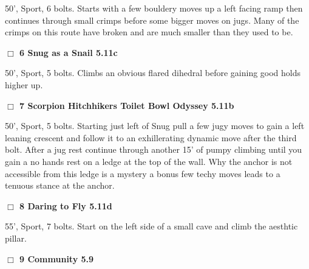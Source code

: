 \begin{multicols}{2}
\begin{adjustwidth}{1.3em}{}
50', Sport, 6 bolts. Starts with a few bouldery moves up a left facing ramp then continues through small crimps before some bigger moves on jugs. Many of the crimps on this route have broken and are much smaller than they used to be.
\end{adjustwidth}




\needspace{2em}
\label{rt:Snug as a Snail}
\colorbox{RoyalBlue!20}{
\parbox{0.95\linewidth}{
\hspace{-1ex}\textbf{$\Box$
6 Snug as a Snail 5.11c  
}}}
\begin{adjustwidth}{1.3em}{}			

50', Sport, 5 bolts. Climbs an obvious flared dihedral before gaining good holds higher up.
\end{adjustwidth}




\needspace{2em}
\label{rt:Scorpion Hitchhikers Toilet Bowl Odyssey}
\colorbox{RoyalBlue!20}{
\parbox{0.95\linewidth}{
\hspace{-1ex}\textbf{$\Box$
7 Scorpion Hitchhikers Toilet Bowl Odyssey 5.11b  
}}}
\begin{adjustwidth}{1.3em}{}			

50', Sport, 5 bolts. Starting just left of Snug pull a few jugy moves to gain a left leaning crescent and follow it to an exhillerating dynamic move after the third bolt. After a jug rest continue through another 15' of pumpy climbing until you gain a no hands rest on a ledge at the top of the wall. Why the anchor is not accessible from this ledge is a mystery a bonus few techy moves leads to a tenuous stance at the anchor.
\end{adjustwidth}




\needspace{2em}
\label{rt:Daring to Fly}
\colorbox{RoyalBlue!20}{
\parbox{0.95\linewidth}{
\hspace{-1ex}\textbf{$\Box$
8 Daring to Fly 5.11d  
}}}
\begin{adjustwidth}{1.3em}{}			

55', Sport, 7 bolts. Start on the left side of a small cave and climb the aesthtic pillar.
\end{adjustwidth}




\needspace{2em}
\label{rt:Community}
\colorbox{green!20}{
\parbox{0.95\linewidth}{
\hspace{-1ex}\textbf{$\Box$
9 Community 5.9  
}}}
\begin{adjustwidth}{1.3em}{}			


\end{adjustwidth}
\end{multicols}
